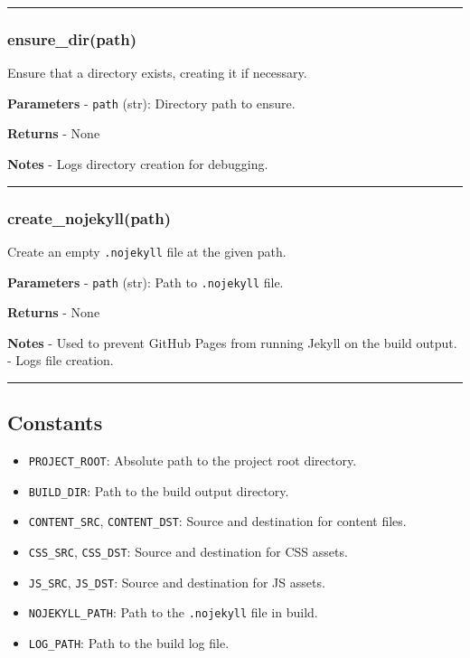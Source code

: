 \begin{center}\rule{0.5\linewidth}{0.5pt}\end{center}

\subsubsection{ensure\_dir(path)}\label{ensure_dirpath}

Ensure that a directory exists, creating it if necessary.

\textbf{Parameters} - \texttt{path} (str): Directory path to ensure.

\textbf{Returns} - None

\textbf{Notes} - Logs directory creation for debugging.

\begin{center}\rule{0.5\linewidth}{0.5pt}\end{center}

\subsubsection{create\_nojekyll(path)}\label{create_nojekyllpath}

Create an empty \texttt{.nojekyll} file at the given path.

\textbf{Parameters} - \texttt{path} (str): Path to \texttt{.nojekyll}
file.

\textbf{Returns} - None

\textbf{Notes} - Used to prevent GitHub Pages from running Jekyll on the
build output. - Logs file creation.

\begin{center}\rule{0.5\linewidth}{0.5pt}\end{center}

\subsection{Constants}\label{constants}

\begin{itemize}
\tightlist
\item
  \texttt{PROJECT\_ROOT}: Absolute path to the project root directory.
\item
  \texttt{BUILD\_DIR}: Path to the build output directory.
\item
  \texttt{CONTENT\_SRC}, \texttt{CONTENT\_DST}: Source and destination
  for content files.
\item
  \texttt{CSS\_SRC}, \texttt{CSS\_DST}: Source and destination for CSS
  assets.
\item
  \texttt{JS\_SRC}, \texttt{JS\_DST}: Source and destination for JS
  assets.
\item
  \texttt{NOJEKYLL\_PATH}: Path to the \texttt{.nojekyll} file in build.
\item
  \texttt{LOG\_PATH}: Path to the build log file.
\end{itemize}


